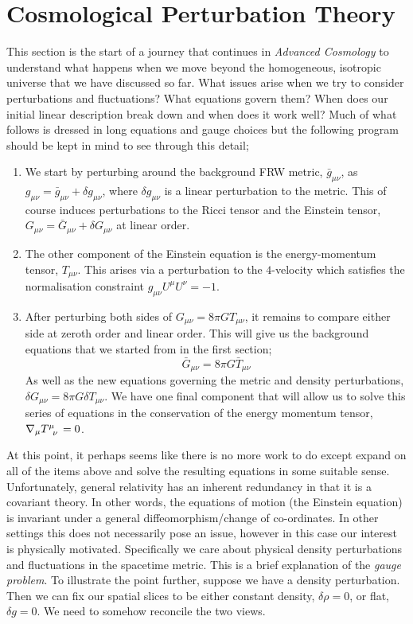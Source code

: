 \section{Cosmological Perturbation Theory}
This section is the start of a journey that continues in \emph{Advanced Cosmology} to understand what happens when we move beyond the homogeneous, isotropic universe that we have discussed so far. What issues arise when we try to consider perturbations and fluctuations? What equations govern them? When does our initial linear description break down and when does it work well? Much of what follows is dressed in long equations and gauge choices but the following program should be kept in mind to see through this detail;
\begin{enumerate}
\item We start by perturbing around the background FRW metric, $\bar{g}_{\mu\nu}$, as $g_{\mu\nu} = \bar{g}_{\mu\nu} + \delta g_{\mu\nu}$, where $\delta g_{\mu\nu}$ is a linear perturbation to the metric. This of course induces perturbations to the Ricci tensor and the Einstein tensor, $G_{\mu\nu} = \bar{G}_{\mu\nu} + \delta G_{\mu\nu}$ at linear order. 
\item The other component of the Einstein equation is the energy-momentum tensor, $T_{\mu\nu}$. This arises via a perturbation to the $4$-velocity which satisfies the normalisation constraint $g_{\mu\nu}U^{\mu}U^{\nu} = -1$.
\item After perturbing both sides of $G_{\mu\nu} = 8\pi G T_{\mu\nu}$, it remains to compare either side at zeroth order and linear order. This will give us the background equations that we started from in the first section;
\begin{equation*}
\bar{G}_{\mu\nu} = 8\pi G \bar{T}_{\mu\nu}
\end{equation*}
As well as the new equations governing the metric and density perturbations, $\delta G_{\mu\nu} = 8\pi G \delta T_{\mu\nu}$. We have one final component that will allow us to solve this series of equations in the conservation of the energy momentum tensor, $\nabla_\mu T\indices{^{\mu}_{\nu}} = 0$. 
\end{enumerate}
At this point, it perhaps seems like there is no more work to do except expand on all of the items above and solve the resulting equations in some suitable sense. Unfortunately, general relativity has an inherent redundancy in that it is a covariant theory. In other words, the equations of motion (the Einstein equation) is invariant under a general diffeomorphism/change of co-ordinates. In other settings this does not necessarily pose an issue, however in this case our interest is physically motivated. Specifically we care about physical density perturbations and fluctuations in the spacetime metric. This is a brief explanation of the \emph{gauge problem}. To illustrate the point further, suppose we have a density perturbation. Then we can fix our spatial slices to be either constant density, $\delta \rho = 0$, or flat, $\delta g = 0$. We need to somehow reconcile the two views.
